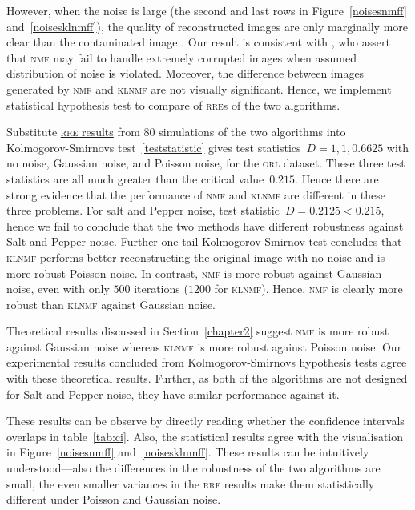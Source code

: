 However, when the noise is large (the second and last rows in Figure~\ref{noisesnmff} and~\ref{noisesklnmff}), the quality of reconstructed images are only marginally more clear than the contaminated image .
Our result is consistent  with \citet{guan2017truncated}, who assert that \textsc{nmf} may fail to handle extremely corrupted images when assumed distribution of noise is violated.
Moreover, the difference between images generated by \textsc{nmf} and \textsc{klnmf} are not visually significant.
Hence, we implement statistical hypothesis test to compare of \textsc{rre}s of the two algorithms.

Substitute \href{https://raw.githubusercontent.com/JoyceXinyueWang/nmf_raw_data/master/raw_result_acc.csv}{\textsc{rre} results} from $80$ simulations of the two algorithms into Kolmogorov-Smirnovs test~\eqref{teststatistic} gives test statistics~$D=1, 1 ,0.6625$ with no noise, Gaussian noise, and Poisson noise, for the \textsc{orl} dataset. These three test statistics are all much greater than the critical value~$0.215$. Hence there are strong evidence that the performance of \textsc{nmf} and \textsc{klnmf} are different in these three problems. For salt and Pepper noise, test statistic~$D=0.2125<0.215$, hence we fail to conclude that the two methods have different robustness against Salt and Pepper noise. Further one tail Kolmogorov-Smirnov test concludes that \textsc{klnmf} performs better reconstructing the original image with no noise and is more robust Poisson noise.
In contrast, \textsc{nmf} is more robust against Gaussian noise, even with only $500$ iterations ($1200$ for \textsc{klnmf}). Hence, \textsc{nmf} is clearly more robust than \textsc{klnmf} against Gaussian noise.

Theoretical results discussed in Section~\ref{chapter2} suggest \textsc{nmf} is more robust against Gaussian noise whereas \textsc{klnmf} is more robust against Poisson noise. Our experimental results concluded from Kolmogorov-Smirnovs hypothesis tests agree with these theoretical results. Further, as both of the algorithms are not designed for Salt and Pepper noise, they have similar performance against it.

These results can be observe by directly reading whether the confidence intervals overlaps in table~\ref{tab:ci}. Also, the statistical results agree with the visualisation in Figure~\ref{noisesnmff} and~\ref{noisesklnmff}. These results can be intuitively understood---also the differences in the robustness of the two algorithms are small, the even smaller variances in the \textsc{rre} results make them statistically different under Poisson and Gaussian noise.

